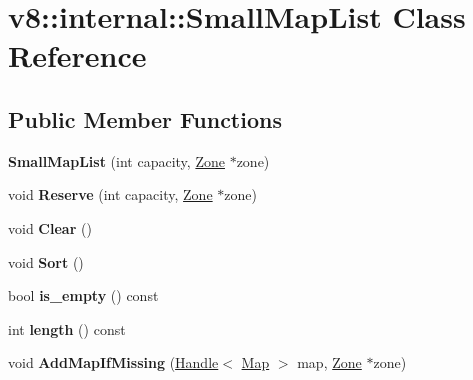 \hypertarget{classv8_1_1internal_1_1_small_map_list}{}\section{v8\+:\+:internal\+:\+:Small\+Map\+List Class Reference}
\label{classv8_1_1internal_1_1_small_map_list}
\subsection*{Public Member Functions}
\begin{DoxyCompactItemize}
\item 
{\bfseries Small\+Map\+List} (int capacity, \hyperlink{classv8_1_1internal_1_1_zone}{Zone} $\ast$zone)\hypertarget{classv8_1_1internal_1_1_small_map_list_aecb66fe2f470f52e8c57961930979878}{}\label{classv8_1_1internal_1_1_small_map_list_aecb66fe2f470f52e8c57961930979878}

\item 
void {\bfseries Reserve} (int capacity, \hyperlink{classv8_1_1internal_1_1_zone}{Zone} $\ast$zone)\hypertarget{classv8_1_1internal_1_1_small_map_list_ab5745a78d622f8a9eb3edd983b0d6a43}{}\label{classv8_1_1internal_1_1_small_map_list_ab5745a78d622f8a9eb3edd983b0d6a43}

\item 
void {\bfseries Clear} ()\hypertarget{classv8_1_1internal_1_1_small_map_list_ac05d9cbaab14cc518bcb42992aaab7ab}{}\label{classv8_1_1internal_1_1_small_map_list_ac05d9cbaab14cc518bcb42992aaab7ab}

\item 
void {\bfseries Sort} ()\hypertarget{classv8_1_1internal_1_1_small_map_list_a5368e76e4025a3836d979233a43ba600}{}\label{classv8_1_1internal_1_1_small_map_list_a5368e76e4025a3836d979233a43ba600}

\item 
bool {\bfseries is\+\_\+empty} () const \hypertarget{classv8_1_1internal_1_1_small_map_list_a63b945aaaeefd59502cc857975e9331e}{}\label{classv8_1_1internal_1_1_small_map_list_a63b945aaaeefd59502cc857975e9331e}

\item 
int {\bfseries length} () const \hypertarget{classv8_1_1internal_1_1_small_map_list_aa8f922e203e547a73ba3ac694c39f4cc}{}\label{classv8_1_1internal_1_1_small_map_list_aa8f922e203e547a73ba3ac694c39f4cc}

\item 
void {\bfseries Add\+Map\+If\+Missing} (\hyperlink{classv8_1_1internal_1_1_handle}{Handle}$<$ \hyperlink{classv8_1_1internal_1_1_map}{Map} $>$ map, \hyperlink{classv8_1_1internal_1_1_zone}{Zone} $\ast$zone)\hypertarget{classv8_1_1internal_1_1_small_map_list_a9d0c3fb58c0982a09daff10a32d55c13}{}\label{classv8_1_1internal_1_1_small_map_list_a9d0c3fb58c0982a09daff10a32d55c13}


\end{DoxyCompactItemize}
